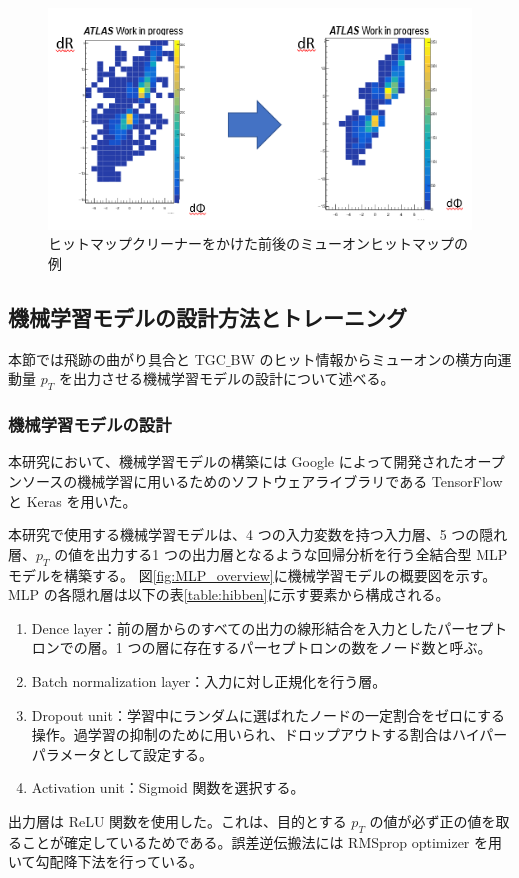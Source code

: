 \begin{figure}[tb]
  \centering
  \includegraphics[clip, width=14cm]{fig/4/cleaner.png}
  \caption{ヒットマップクリーナーをかけた前後のミューオンヒットマップの例}
  \label{fig:hitmapcleaner}
\end{figure}


\subsection{機械学習モデルの設計方法とトレーニング}
本節では飛跡の曲がり具合と TGC$\_$BW のヒット情報からミューオンの横方向運動量 $p_T$ を出力させる機械学習モデルの設計について述べる。

\subsubsection{機械学習モデルの設計}

本研究において、機械学習モデルの構築には Google によって開発されたオープンソースの機械学習に用いるためのソフトウェアライブラリである TensorFlow と Keras を用いた。

本研究で使用する機械学習モデルは、4 つの入力変数を持つ入力層、5 つの隠れ層、$p_T$ の値を出力する1 つの出力層となるような回帰分析を行う全結合型 MLP モデルを構築する。
図\ref{fig:MLP_overview}に機械学習モデルの概要図を示す。
MLP の各隠れ層は以下の表\ref{table:hibben}に示す要素から構成される。
\begin{enumerate}\label{table:hibben}
   \item Dence layer：前の層からのすべての出力の線形結合を入力としたパーセプトロンでの層。1 つの層に存在するパーセプトロンの数をノード数と呼ぶ。
   \item Batch normalization layer：入力に対し正規化を行う層。
   \item Dropout unit：学習中にランダムに選ばれたノードの一定割合をゼロにする操作。過学習の抑制のために用いられ、ドロップアウトする割合はハイパーパラメータとして設定する。
   \item Activation unit：Sigmoid 関数を選択する。
\end{enumerate}
出力層は ReLU 関数を使用した。これは、目的とする $p_T$ の値が必ず正の値を取ることが確定しているためである。誤差逆伝搬法には RMSprop optimizer を用いて勾配降下法を行っている。

